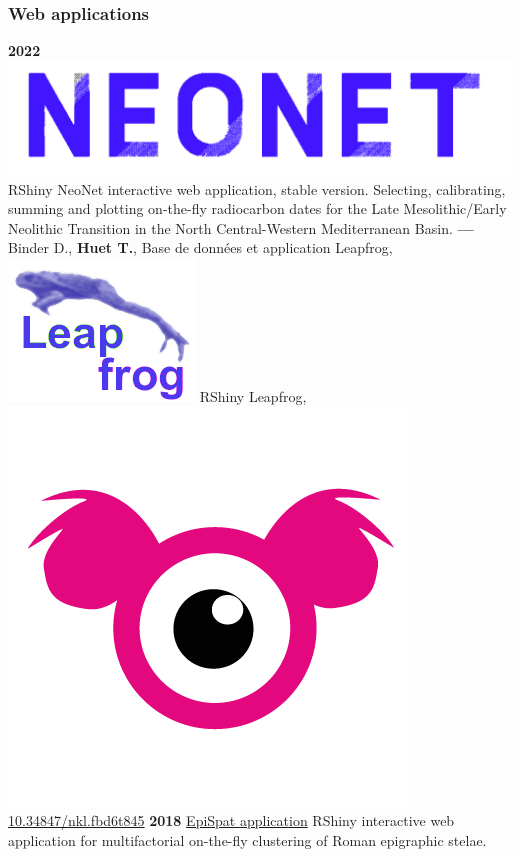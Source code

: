 \documentclass{article}
\begin{document}
\subsubsection*{Web applications}

\smallbreak
\textbf{2022 }\href{http://shinyserver.cfs.unipi.it:3838/C14/}{\includegraphics[scale=0.04]{neonet-blue.png}} \textsf{RShiny} NeoNet interactive web application, stable version. Selecting, calibrating, summing and plotting on-the-fly radiocarbon dates for the Late Mesolithic/Early Neolithic Transition in the North Central-Western Mediterranean Basin.
\smallbreak
\textbf{--- } Binder D., \textbf{Huet T.}, Base de données et application Leapfrog, \href{https://devr.cepam.cnrs.fr/shinyapps/leap/}{\includegraphics[scale=0.10]{leapfrog-blue.png}} \textsf{RShiny} Leapfrog, \href{https://nakala.fr/10.34847/nkl.fbd6t845}{\includegraphics[scale=0.03]{app-nakala.png} 10.34847/nkl.fbd6t845}
\textbf{2018 }\href{https://epispat.shinyapps.io/analyses_mult_5/}{EpiSpat application} \textsf{RShiny} interactive web application for multifactorial on-the-fly clustering of Roman epigraphic stelae.
\smallbreak
\end{document}
